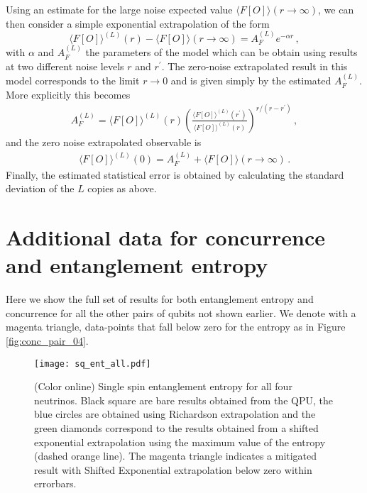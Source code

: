 \documentclass[10pt]{article}
\begin{document}
Using an estimate for the large noise expected value $\langle F[O]\rangle(r\rightarrow\infty)$, we can then consider a simple exponential extrapolation of the form
\begin{equation}
\langle F[O]\rangle^{(L)}(r)-\langle F[O]\rangle(r\rightarrow\infty) = A^{(L)}_F e^{-\alpha r}\, ,
\label{eq:exp-reshifted}
\end{equation}
with $\alpha $ and $A^{(L)}_F$ the parameters of the model which can be obtain using results at two different noise levels $r$ and $r^\prime$.
The zero-noise extrapolated result in this model corresponds to the limit $r\to0$ and is given simply by the estimated $A^{(L)}_F$. More explicitly this becomes
\begin{eqnarray}
A^{(L)}_F=\langle F[O]\rangle^{(L)}(r)\left(\frac{\langle F[O]\rangle^{(L)}(r^\prime)}{\langle F[O]\rangle^{(L)}(r)}\right)^{r/(r-r^\prime)}\, ,
\end{eqnarray}
and the zero noise extrapolated observable is
\begin{eqnarray}
\langle F[O]\rangle^{(L)}(0)=A^{(L)}_F+ \langle F[O]\rangle(r\rightarrow\infty)\, .
\end{eqnarray}
Finally, the estimated statistical error is obtained by calculating the standard deviation of the $L$ copies as above. 

\section{Additional data for concurrence and entanglement entropy}
\label{app:sq_ent}
Here we show the full set of results for both entanglement entropy and concurrence for all the other pairs of qubits not shown earlier. We denote with a magenta triangle, data-points that fall below zero for the entropy as in Figure \ref{fig:conc_pair_04}.

\begin{figure}[h!]
 \centering
 \texttt{[image: sq\_ent\_all.pdf]}
 \caption{(Color online) Single spin entanglement entropy for all four neutrinos. Black square are bare results obtained from the QPU, the blue circles are obtained using Richardson extrapolation and the green diamonds correspond to the results obtained from a shifted exponential extrapolation using the maximum value of the entropy (dashed orange line). The magenta triangle indicates a mitigated result with Shifted Exponential extrapolation below zero within errorbars.}
\label{fig:sq_all}
\end{figure}
\end{document}
